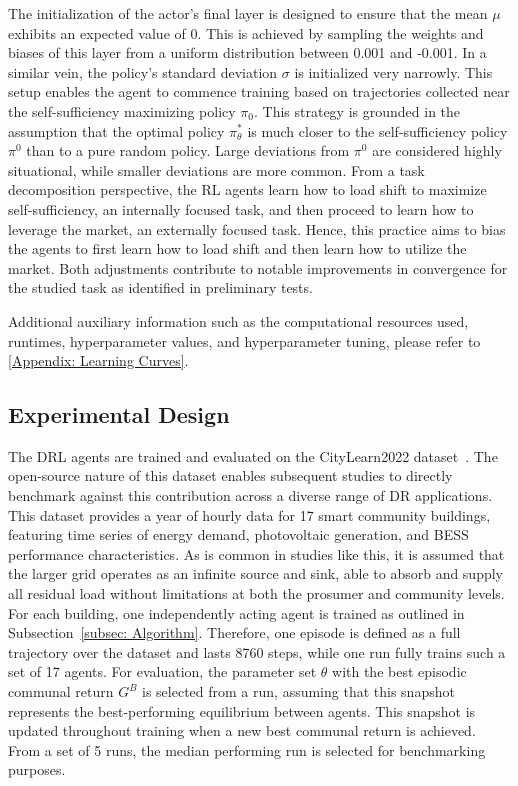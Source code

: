 \documentclass[preprint, 12pt]{elsarticle}
\begin{document}
The initialization of the actor's final layer is designed to ensure that the mean $\mu$ exhibits an expected value of 0. This is achieved by sampling the weights and biases of this layer from a uniform distribution between 0.001 and -0.001. In a similar vein, the policy's standard deviation $\sigma$ is initialized very narrowly. This setup enables the agent to commence training based on trajectories collected near the self-sufficiency maximizing policy $\pi_{0}$. This strategy is grounded in the assumption that the optimal policy $\pi^{*}_{\theta}$ is much closer to the self-sufficiency policy $\pi^{0}$ than to a pure random policy. Large deviations from $\pi^0$ are considered highly situational, while smaller deviations are more common. From a task decomposition perspective, the RL agents learn how to load shift to maximize self-sufficiency, an internally focused task, and then proceed to learn how to leverage the market, an externally focused task. Hence, this practice aims to bias the agents to first learn how to load shift and then learn how to utilize the market. Both adjustments contribute to notable improvements in convergence for the studied task as identified in preliminary tests.

Additional auxiliary information such as the computational resources used, runtimes, 
hyperparameter values, and hyperparameter tuning,
please refer to \ref{Appendix: Learning Curves}.

\subsection{Experimental Design} \label{subsec: Experimental Design}
The DRL agents are trained and evaluated on the CityLearn2022 dataset~\cite{CityLearn2022Data}. The open-source nature of this dataset enables subsequent studies to directly benchmark against this contribution across a diverse range of DR applications. This dataset provides a year of hourly data for 17 smart community buildings, featuring time series of energy demand, photovoltaic generation, and BESS performance characteristics. 
As is common in studies like this, it is assumed that the larger grid operates as an infinite source and sink, able to absorb and supply all residual load without limitations at both the prosumer and community levels.
For each building, one independently acting agent is trained as outlined in Subsection~\ref{subsec: Algorithm}. Therefore, one episode is defined as a full trajectory over the dataset and lasts 8760 steps, while one run fully trains such a set of 17 agents. For evaluation, the parameter set $\theta$ with the best episodic communal return $G^{B}$ is selected from a run, assuming that this snapshot represents the best-performing equilibrium between agents. This snapshot is updated throughout training when a new best communal return is achieved. From a set of 5 runs, the median performing run is selected for benchmarking purposes.
\end{document}
